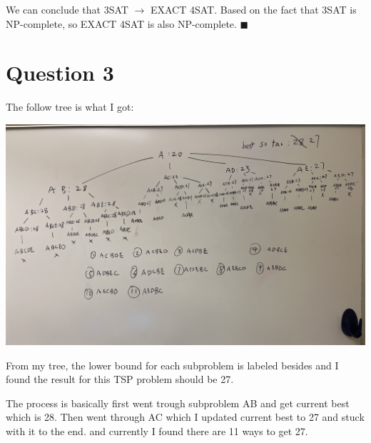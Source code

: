 \documentclass{article}
\begin{document}
We can conclude that 3SAT $\rightarrow$ EXACT 4SAT. Based on the fact that 3SAT is NP-complete,
so EXACT 4SAT is also NP-complete. $\blacksquare$






\section*{Question 3}
The follow tree is what I got:
\begin{center}
  \includegraphics[scale = 0.1]{trees.jpeg}
\end{center}

From my tree, the lower bound for each subproblem is labeled besides and I found the result for
this TSP problem should be 27. 

The process is basically first went trough subproblem AB and get current best which is 28. Then went through AC which I updated current best to 27 and stuck with it to the end.
and currently I found there are 11 ways to get 27.
\end{document}
